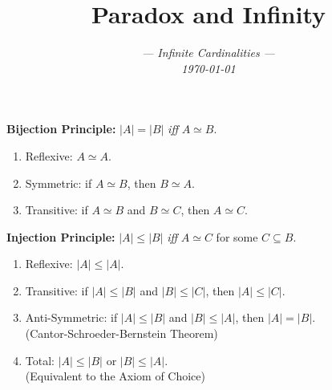 \documentclass[handout]{beamer}
\title[Short title]{\LARGE Paradox and Infinity} %
\author{\it --- Infinite Cardinalities ---\\ \small \today } %
\date{} %
\newcommand{\abs}[1]{|#1|} %
\begin{document}
\begin{frame}
\titlepage %
\end{frame}










\begin{frame}

  \textbf{Bijection Principle:} $\abs{A}=\abs{B}$ \textit{iff} $A\simeq B$.
  \pause

  \begin{enumerate}
    \item Reflexive: $A \simeq A$.
    \item Symmetric: if $A \simeq B$, then $B \simeq A$.
    \item Transitive: if $A \simeq B$ and $B \simeq C$, then $A \simeq C$.
  \end{enumerate}

\end{frame}


\begin{frame}

  \textbf{Injection Principle:} $\abs{A} \leq \abs{B}$ \textit{iff} $A \simeq C$ for some $C\subseteq B$. 
  \pause

  \begin{enumerate}
    \item Reflexive: $|A| \leq |A|$.
    \item Transitive: if $|A| \leq |B|$ and $|B| \leq |C|$, then $|A| \leq |C|$.
    \item Anti-Symmetric: if $|A| \leq |B|$ and $|B| \leq |A|$, then $|A| = |B|$.\\
      (Cantor-Schroeder-Bernstein Theorem)
    \item Total: $|A| \leq |B|$ or $|B| \leq |A|$.\\
      (Equivalent to the Axiom of Choice)
  \end{enumerate}

\end{frame}
\end{document}
